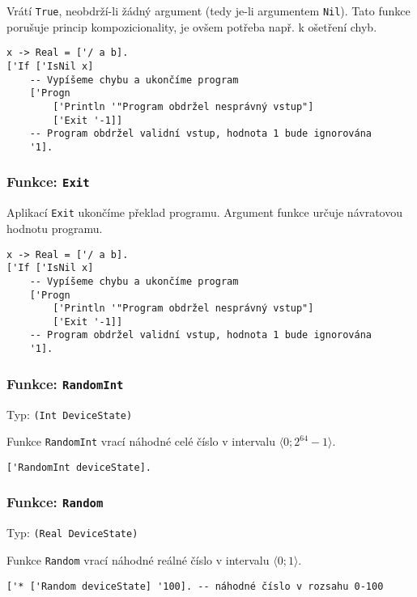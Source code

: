Vrátí \lstinline{True}, neobdrží-li žádný argument (tedy je-li argumentem \lstinline{Nil}). Tato
funkce porušuje princip kompozicionality, je ovšem potřeba např. k ošetření chyb.

\begin{lstlisting}[caption={Ukázka využití IsNil}]
x -> Real = ['/ a b].
['If ['IsNil x]
    -- Vypíšeme chybu a ukončíme program
    ['Progn
        ['Println '"Program obdržel nesprávný vstup"]
        ['Exit '-1]]
    -- Program obdržel validní vstup, hodnota 1 bude ignorována
    '1].
\end{lstlisting}

\subsubsection*{Funkce: \lstinline{Exit}}

Aplikací \lstinline{Exit} ukončíme překlad programu. Argument funkce určuje návratovou hodnotu
programu.

\begin{lstlisting}[caption={Ukázka využití Exit}]
x -> Real = ['/ a b].
['If ['IsNil x]
    -- Vypíšeme chybu a ukončíme program
    ['Progn
        ['Println '"Program obdržel nesprávný vstup"]
        ['Exit '-1]]
    -- Program obdržel validní vstup, hodnota 1 bude ignorována
    '1].
\end{lstlisting}

\subsubsection*{Funkce: \lstinline{RandomInt}}
Typ: \lstinline{(Int DeviceState)}

Funkce \lstinline{RandomInt} vrací náhodné celé číslo v intervalu $\bigl \langle 0; 2^{64}-1 \bigr \rangle$.

\begin{lstlisting}[caption={Ukázka využití RandomInt}]
['RandomInt deviceState].
\end{lstlisting}

\subsubsection*{Funkce: \lstinline{Random}}
Typ: \lstinline{(Real DeviceState)}

Funkce \lstinline{Random} vrací náhodné reálné číslo v intervalu $\bigl \langle 0; 1 \bigr \rangle$.

\begin{lstlisting}[caption={Ukázka využití Random}]
['* ['Random deviceState] '100]. -- náhodné číslo v rozsahu 0-100
\end{lstlisting}

